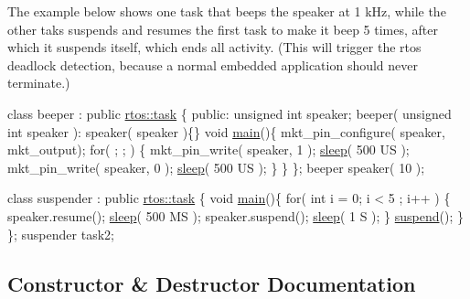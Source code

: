 The example below shows one task that beeps the speaker at 1 k\+Hz, while the other taks suspends and resumes the first task to make it beep 5 times, after which it suspends itself, which ends all activity. (This will trigger the rtos deadlock detection, because a normal embedded application should never terminate.)


\begin{DoxyCode}
\textcolor{keyword}{class }beeper : \textcolor{keyword}{public} \hyperlink{classrtos_1_1task}{rtos::task} \{
\textcolor{keyword}{public}:
   \textcolor{keywordtype}{unsigned} \textcolor{keywordtype}{int} speaker;
   beeper( \textcolor{keywordtype}{unsigned} \textcolor{keywordtype}{int} speaker ): speaker( speaker )\{\}
   \textcolor{keywordtype}{void} \hyperlink{classrtos_1_1task__base_a67892c7e1f734e0a91baa5a4fc6dea27}{main}()\{
      mkt\_pin\_configure( speaker, mkt\_output);
      \textcolor{keywordflow}{for}( ; ; ) \{
         mkt\_pin\_write( speaker, 1  );
         \hyperlink{classrtos_1_1task__base_a16101726a2ed9744face297f9373b632}{sleep}( 500 US );
         mkt\_pin\_write( speaker, 0  );
         \hyperlink{classrtos_1_1task__base_a16101726a2ed9744face297f9373b632}{sleep}( 500 US );
      \}
   \}
\};
beeper speaker( 10 );

\textcolor{keyword}{class }suspender : \textcolor{keyword}{public} \hyperlink{classrtos_1_1task}{rtos::task} \{
   \textcolor{keywordtype}{void} \hyperlink{classrtos_1_1task__base_a67892c7e1f734e0a91baa5a4fc6dea27}{main}()\{
      \textcolor{keywordflow}{for}( \textcolor{keywordtype}{int} i = 0; i < 5 ; i++ ) \{
         speaker.resume();
         \hyperlink{classrtos_1_1task__base_a16101726a2ed9744face297f9373b632}{sleep}( 500 MS );
         speaker.suspend();
         \hyperlink{classrtos_1_1task__base_a16101726a2ed9744face297f9373b632}{sleep}( 1 S );
      \}
      \hyperlink{classrtos_1_1task__base_a23f6f33e6e2f3dbe35583c4eb2efe5f8}{suspend}();
   \}
\};
suspender task2;
\end{DoxyCode}
 

\subsection{Constructor \& Destructor Documentation}
